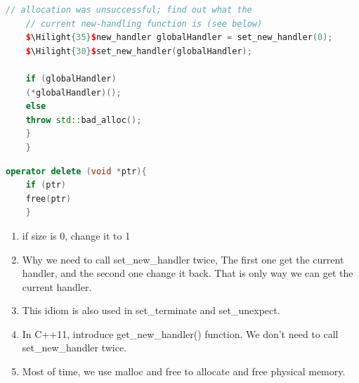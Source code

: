 \documentclass[a4paper,12pt,twoside]{book}
\newcommand{\Hilight}[1]{\makebox[0pt][l]{\color{yellow}\rule[-3pt]{#1em}{11pt}}}
\begin{document}
\begin{itemize}
\begin{lstlisting}[frame=single, language=c++]
	// allocation was unsuccessful; find out what the
	// current new-handling function is (see below)
	$\Hilight{35}$new_handler globalHandler = set_new_handler(0);
	$\Hilight{30}$set_new_handler(globalHandler);
	
	if (globalHandler) 
	(*globalHandler)();
	else 
	throw std::bad_alloc();
	}
	}
	\end{lstlisting}
	
	\begin{lstlisting}[frame=single, language=c++]
	operator delete (void *ptr){
	if (ptr)
	free(ptr)
	}
	\end{lstlisting}
	\begin{enumerate}
		\item if size is 0, change it to 1
		\item Why we need to call set\_new\_handler twice, The first one get the current handler, and the second one change it back. That is only way we can get the current handler.
		
		\item This idiom is also used in set\_terminate and set\_unexpect. 
		
		\item In C++11, introduce get\_new\_handler() function. We don't need to call set\_new\_handler twice. 
		
		\item Most of time, we use malloc and free to allocate and free physical memory.
	\end{enumerate}
\end{itemize}
\end{document}
